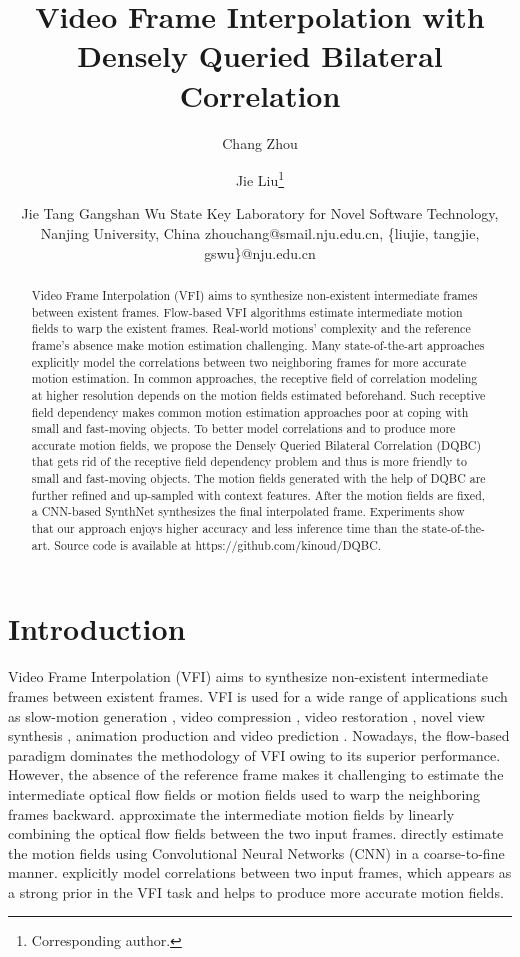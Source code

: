 \documentclass{article}
\title{Video Frame Interpolation with Densely Queried Bilateral Correlation}
\author{
Chang Zhou
\and
Jie Liu\thanks{Corresponding author.}\and
Jie Tang\And
Gangshan Wu
\affiliations
State Key Laboratory for Novel Software Technology, Nanjing University, China
\emails
zhouchang@smail.nju.edu.cn,
\{liujie, tangjie, gswu\}@nju.edu.cn
}
\begin{document}
\maketitle

\begin{abstract}
   Video Frame Interpolation (VFI) aims to synthesize non-existent intermediate frames between existent frames. Flow-based VFI algorithms estimate intermediate motion fields to warp the existent frames. Real-world motions' complexity and the reference frame's absence make motion estimation challenging. Many state-of-the-art approaches explicitly model the correlations between two neighboring frames for more accurate motion estimation. In common approaches, the receptive field of correlation modeling at higher resolution depends on the motion fields estimated beforehand. Such receptive field dependency makes common motion estimation approaches poor at coping with small and fast-moving objects. To better model correlations and to produce more accurate motion fields, we propose the Densely Queried Bilateral Correlation (DQBC) that gets rid of the receptive field dependency problem and thus is more friendly to small and fast-moving objects. The motion fields generated with the help of DQBC are further refined and up-sampled with context features. After the motion fields are fixed, a CNN-based SynthNet synthesizes the final interpolated frame. Experiments show that our approach enjoys higher accuracy and less inference time than the state-of-the-art. Source code is available at https://github.com/kinoud/DQBC.
\end{abstract}

\section{Introduction}

Video Frame Interpolation (VFI) aims to synthesize non-existent intermediate frames between existent frames. VFI is used for a wide range of applications such as slow-motion generation \cite{superslomo}, video compression \cite{compression}, video restoration \cite{restore1,restore2,restore3}, novel view synthesis \cite{novel_view,novel_view2}, animation production \cite{animeinterp,anime2,anime3} and video prediction \cite{vfp}. Nowadays, the flow-based paradigm dominates the methodology of VFI owing to its superior performance. However, the absence of the reference frame makes it challenging to estimate the intermediate optical flow fields or motion fields used to warp the neighboring frames backward. \cite{dain,superslomo,liu2019deep,context_aware,toflow} approximate the intermediate motion fields by linearly combining the optical flow fields between the two input frames. \cite{film,rife,ifrnet} directly estimate the motion fields using Convolutional Neural Networks (CNN) in a coarse-to-fine manner. \cite{bmbc,abme,vfiformer} explicitly model correlations between two input frames, which appears as a strong prior in the VFI task and helps to produce more accurate motion fields.
\end{document}
